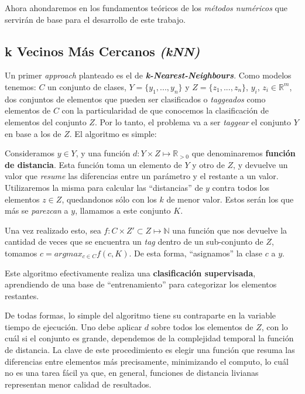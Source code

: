 Ahora ahondaremos en los fundamentos te\'oricos de los \textit{m\'etodos num\'ericos} que servir\'an de base para el desarrollo de este trabajo.

\subsection{k Vecinos M\'as Cercanos \textit{(kNN)}}

Un primer \textit{approach} planteado es el de \textit{\textbf{k-Nearest-Neighbours}}. Como modelos tenemos: $C$ un conjunto de clases, $Y = \{y_{1}, ..., y_{n}\}$ y $Z = \{z_{1}, ..., z_{n}\}$, $y_{i}$, $z_{i} \in \mathbb{R}^m$, dos conjuntos de elementos que pueden ser clasificados o \textit{taggeados} como elementos de $C$ con la particularidad de que conocemos la clasificaci\'on de elementos del conjunto $Z$. Por lo tanto, el problema va a ser \textit{taggear} el conjunto $Y$ en base a los de $Z$. El algoritmo es simple:

Consideramos $y \in Y$, y una funci\'on $d : Y \times Z \mapsto \mathbb{R}_{> 0}$ que denominaremos \textbf{funci\'on de distancia}. Esta funci\'on toma un elemento de $Y$ y otro de $Z$, y devuelve un valor que \textit{resume} las diferencias entre un par\'ametro y el restante a un valor. Utilizaremos la misma para calcular las ``distancias'' de $y$ contra todos los elementos $z \in Z$, quedandonos s\'olo con los $k$ de menor valor. Estos ser\'an los que m\'as se \textit{parezcan} a $y$, llamamos a este conjunto $K$.

Una vez realizado esto, sea $f : C \times Z' \subset Z \mapsto \mathbb{N}$ una funci\'on que nos devuelve la cantidad de veces que se encuentra un \textit{tag} dentro de un sub-conjunto de $Z$, tomamos $c = argmax_{c \in C} f(c, K)$. De esta forma, ``asignamos'' la clase $c$ a $y$.

Este algoritmo efectivamente realiza una \textbf{clasificaci\'on supervisada}, aprendiendo de una base de ``entrenamiento'' para categorizar los elementos restantes.

De todas formas, lo simple del algoritmo tiene su contraparte en la variable tiempo de ejecuci\'on. Uno debe aplicar $d$ sobre todos los elementos de $Z$, con lo cu\'al si el conjunto es grande, dependemos de la complejidad temporal la funci\'on de distancia. La clave de este procedimiento es elegir una funci\'on que resuma las diferencias entre elementos m\'as precisamente, minimizando el computo, lo cu\'al no es una tarea f\'acil ya que, en general, funciones de distancia livianas representan menor calidad de resultados.

